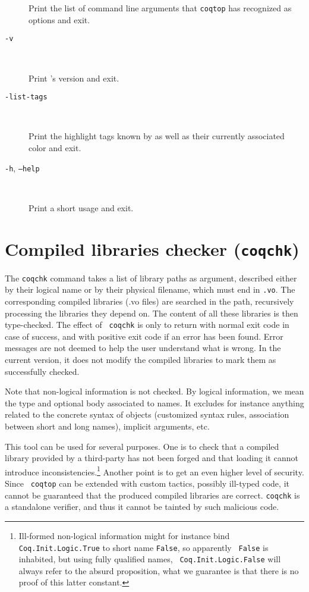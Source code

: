 \begin{description}
  Print the list of command line arguments that {\tt coqtop} has
  recognized as options and exit.

\item[{\tt -v}]\ %

  Print \Coq's version and exit.

\item[{\tt -list-tags}]\ %

  Print the highlight tags known by {\Coq} as well as their currently associated
  color and exit.

\item[{\tt -h}, {\tt --help}]\ %

  Print a short usage and exit.

\end{description}


\section{Compiled libraries checker ({\tt coqchk})}

The {\tt coqchk} command takes a list of library paths as argument, described
either by their logical name or by their physical filename, which must end in
{\tt .vo}. The corresponding compiled libraries (.vo files) are searched in the
path, recursively processing the libraries they depend on. The content
of all these libraries is then type-checked. The effect of {\tt
  coqchk} is only to return with normal exit code in case of success,
and with positive exit code if an error has been found. Error messages
are not deemed to help the user understand what is wrong. In the
current version, it does not modify the compiled libraries to mark
them as successfully checked.

Note that non-logical information is not checked. By logical
information, we mean the type and optional body associated to names.
It excludes for instance anything related to the concrete syntax of
objects (customized syntax rules, association between short and long
names), implicit arguments, etc.

This tool can be used for several purposes. One is to check that a
compiled library provided by a third-party has not been forged and
that loading it cannot introduce inconsistencies.\footnote{Ill-formed
  non-logical information might for instance bind {\tt
    Coq.Init.Logic.True} to short name {\tt False}, so apparently {\tt
    False} is inhabited, but using fully qualified names, {\tt
    Coq.Init.Logic.False} will always refer to the absurd proposition,
  what we guarantee is that there is no proof of this latter
  constant.}
Another point is to get an even higher level of security. Since {\tt
  coqtop} can be extended with custom tactics, possibly ill-typed
code, it cannot be guaranteed that the produced compiled libraries are
correct. {\tt coqchk} is a standalone verifier, and thus it cannot be
tainted by such malicious code.

